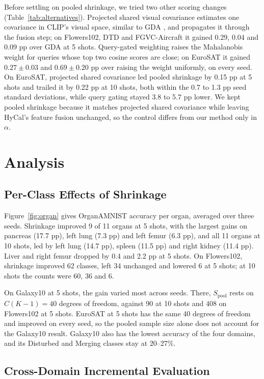 \documentclass[letterpaper]{article} %
\begin{document}
Before settling on pooled shrinkage, we tried two other scoring changes (Table~\ref{tab:alternatives}). Projected shared visual covariance estimates one covariance in CLIP's visual space, similar to GDA \citep{wang2024gda}, and propagates it through the fusion step; on Flowers102, DTD \citep{cimpoi2014dtd} and FGVC-Aircraft \citep{maji2013aircraft} it gained 0.29, 0.04 and 0.09 pp over GDA at 5 shots. Query-gated weighting raises the Mahalanobis weight for queries whose top two cosine scores are close; on EuroSAT it gained $0.27 \pm 0.03$ and $0.69 \pm 0.20$ pp over raising the weight uniformly, on every seed. On EuroSAT, projected shared covariance led pooled shrinkage by 0.15 pp at 5 shots and trailed it by 0.22 pp at 10 shots, both within the 0.7 to 1.3 pp seed standard deviations, while query gating stayed 3.8 to 5.7 pp lower. We kept pooled shrinkage because it matches projected shared covariance while leaving HyCal's feature fusion unchanged, so the control differs from our method only in $\alpha$.

\section{Analysis}

\subsection{Per-Class Effects of Shrinkage}

Figure~\ref{fig:organ} gives OrganAMNIST accuracy per organ, averaged over three seeds. Shrinkage improved 9 of 11 organs at 5 shots, with the largest gains on pancreas (17.7 pp), left lung (7.3 pp) and left femur (6.3 pp), and all 11 organs at 10 shots, led by left lung (14.7 pp), spleen (11.5 pp) and right kidney (11.4 pp). Liver and right femur dropped by 0.4 and 2.2 pp at 5 shots. On Flowers102, shrinkage improved 62 classes, left 34 unchanged and lowered 6 at 5 shots; at 10 shots the counts were 60, 36 and 6.

On Galaxy10 at 5 shots, the gain varied most across seeds. There, $S_{\mathrm{pool}}$ rests on $C(K-1) = 40$ degrees of freedom, against 90 at 10 shots and 408 on Flowers102 at 5 shots. EuroSAT at 5 shots has the same 40 degrees of freedom and improved on every seed, so the pooled sample size alone does not account for the Galaxy10 result. Galaxy10 also has the lowest accuracy of the four domains, and its Disturbed and Merging classes stay at 20--27\%.

\subsection{Cross-Domain Incremental Evaluation}
\end{document}
